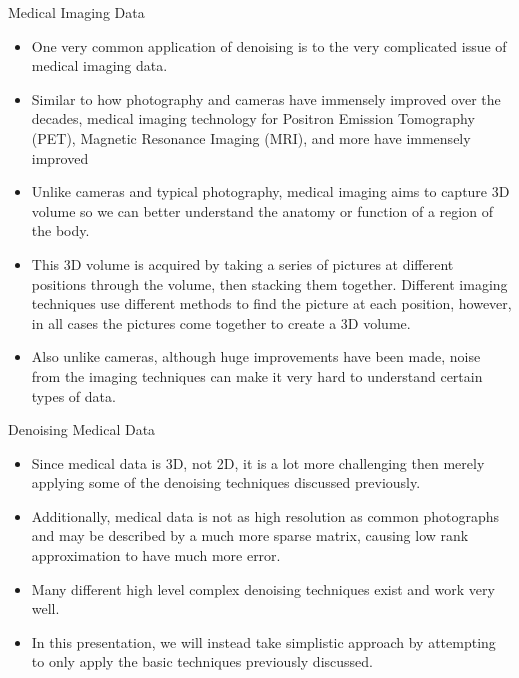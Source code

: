 \documentclass[aspectratio=169,xcolor=dvipsnames]{beamer}
\begin{document}
	
	\begin{frame}{Medical Imaging Data}
		\begin{itemize}
			\item One very common application of denoising is to the very complicated issue of medical imaging data.
			\item Similar to how photography and cameras have immensely improved over the decades, medical imaging technology for Positron Emission Tomography (PET), Magnetic Resonance Imaging (MRI), and more have immensely improved
			\item Unlike cameras and typical photography, medical imaging aims to capture 3D volume so we can better understand the anatomy or function of a region of the body. 
			\item This 3D volume is acquired by taking a series of pictures at different positions through the volume, then stacking them together. Different imaging techniques use different methods to find the picture at each position, however, in all cases the pictures come together to create a 3D volume.
			\item Also unlike cameras, although huge improvements have been made, noise from the imaging techniques can make it very hard to understand certain types of data.
		\end{itemize}
	\end{frame}


	\begin{frame}{Denoising Medical Data}
		\begin{itemize}
			\item Since medical data is 3D, not 2D, it is a lot more challenging then merely applying some of the denoising techniques discussed previously. 
			\item Additionally, medical data is not as high resolution as common photographs and may be described by a much more sparse matrix, causing low rank approximation to have much more error.
			\item Many different high level complex denoising techniques exist and work very well.
			\item In this presentation, we will instead take simplistic approach by attempting to only apply the basic techniques previously discussed.
		\end{itemize}
	\end{frame}
	
\end{document}
